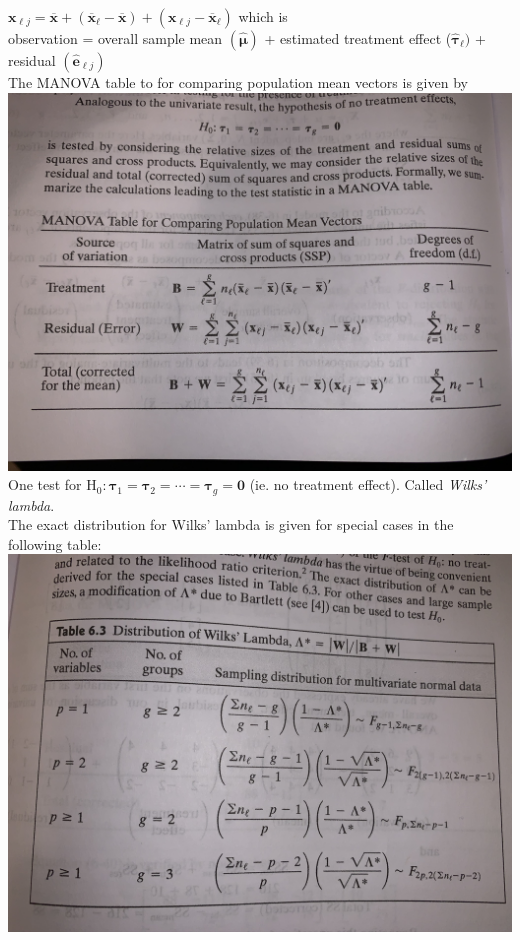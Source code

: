 \documentclass[5pt,twocolumn]{article}
\begin{document}
	$\mathbf{x}_{\ell j} = \mathbf{\overline{x}} + (\mathbf{\overline{x}}_{\ell} - \mathbf{\overline{x}}) + (\mathbf{x}_{\ell j} - \mathbf{\overline{x}}_{\ell})$
	which is\\
	\indent observation = overall sample mean $(\hat{\mathbf{\mu}})$ + estimated treatment effect ($\hat{\mathbf{\tau}}_{\ell})$ + residual $(\hat{\mathbf{e}}_{\ell j})$\\
	The MANOVA table to for comparing population mean vectors is given by\\
	\includegraphics[scale=0.075]{IMG_0491}\\
	One test for $\text{H}_0: \mathbf{\tau}_1 = \mathbf{\tau}_2 = \cdots = \mathbf{\tau}_g = \mathbf{0}$ (ie. no treatment effect). Called \textit{Wilks' lambda}.\\
	The exact distribution for Wilks' lambda is given for special cases in the following table:\\
	\includegraphics[scale=0.12]{IMG_0495}\\
\end{document}
